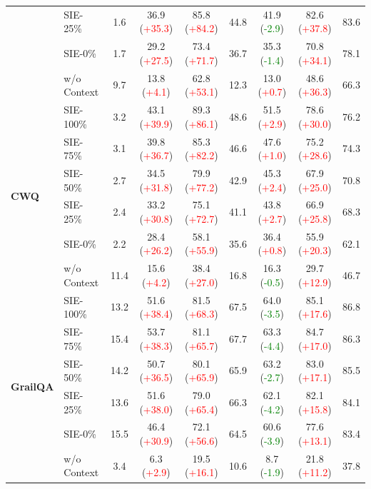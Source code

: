 \documentclass{article} %
\begin{document}
\begin{table}[t]
{\begin{tabular}{l|l|ccc|ccc|c}
& SIE-25\% & 1.6 & 36.9 (\textcolor{red}{+35.3}) & 85.8 (\textcolor{red}{+84.2}) & 44.8 & 41.9 (\textcolor{green}{-2.9}) & 82.6 (\textcolor{red}{+37.8}) & 83.6 \\
& SIE-0\% & 1.7 & 29.2 (\textcolor{red}{+27.5}) & 73.4 (\textcolor{red}{+71.7}) & 36.7 & 35.3 (\textcolor{green}{-1.4}) & 70.8 (\textcolor{red}{+34.1}) & 78.1 \\
& w/o Context & 9.7 & 13.8 (\textcolor{red}{+4.1}) & 62.8 (\textcolor{red}{+53.1}) & 12.3 & 13.0 (\textcolor{red}{+0.7}) & 48.6 (\textcolor{red}{+36.3}) & 66.3 \\
\hline
\multirow{6}{*}{\textbf{CWQ}} 
& SIE-100\% & 3.2 & 43.1 (\textcolor{red}{+39.9}) & 89.3 (\textcolor{red}{+86.1}) & 48.6 & 51.5 (\textcolor{red}{+2.9}) & 78.6 (\textcolor{red}{+30.0}) & 76.2 \\
& SIE-75\% & 3.1 & 39.8 (\textcolor{red}{+36.7}) & 85.3 (\textcolor{red}{+82.2}) & 46.6 & 47.6 (\textcolor{red}{+1.0}) & 75.2 (\textcolor{red}{+28.6}) & 74.3 \\
& SIE-50\% & 2.7 & 34.5 (\textcolor{red}{+31.8}) & 79.9 (\textcolor{red}{+77.2}) & 42.9 & 45.3 (\textcolor{red}{+2.4}) & 67.9 (\textcolor{red}{+25.0}) & 70.8 \\
& SIE-25\% & 2.4 & 33.2 (\textcolor{red}{+30.8}) & 75.1 (\textcolor{red}{+72.7}) & 41.1 & 43.8 (\textcolor{red}{+2.7}) & 66.9 (\textcolor{red}{+25.8}) & 68.3 \\
& SIE-0\% & 2.2 & 28.4 (\textcolor{red}{+26.2}) & 58.1 (\textcolor{red}{+55.9}) & 35.6 & 36.4 (\textcolor{red}{+0.8}) & 55.9 (\textcolor{red}{+20.3}) & 62.1 \\
& w/o Context & 11.4 & 15.6 (\textcolor{red}{+4.2}) & 38.4 (\textcolor{red}{+27.0}) & 16.8 & 16.3 (\textcolor{green}{-0.5}) & 29.7 (\textcolor{red}{+12.9}) & 46.7 \\
\hline
\multirow{6}{*}{\textbf{GrailQA}} 
& SIE-100\% & 13.2 & 51.6 (\textcolor{red}{+38.4}) & 81.5 (\textcolor{red}{+68.3}) & 67.5 & 64.0 (\textcolor{green}{-3.5}) & 85.1 (\textcolor{red}{+17.6}) & 86.8 \\
& SIE-75\% & 15.4 & 53.7 (\textcolor{red}{+38.3}) & 81.1 (\textcolor{red}{+65.7}) & 67.7 & 63.3 (\textcolor{green}{-4.4}) & 84.7 (\textcolor{red}{+17.0}) & 86.3 \\
& SIE-50\% & 14.2 & 50.7 (\textcolor{red}{+36.5}) & 80.1 (\textcolor{red}{+65.9}) & 65.9 & 63.2 (\textcolor{green}{-2.7}) & 83.0 (\textcolor{red}{+17.1}) & 85.5 \\
& SIE-25\% & 13.6 & 51.6 (\textcolor{red}{+38.0}) & 79.0 (\textcolor{red}{+65.4}) & 66.3 & 62.1 (\textcolor{green}{-4.2}) & 82.1 (\textcolor{red}{+15.8}) & 84.1 \\
& SIE-0\% & 15.5 & 46.4 (\textcolor{red}{+30.9}) & 72.1 (\textcolor{red}{+56.6}) & 64.5 & 60.6 (\textcolor{green}{-3.9}) & 77.6 (\textcolor{red}{+13.1}) & 83.4 \\
& w/o Context & 3.4 & 6.3 (\textcolor{red}{+2.9}) & 19.5 (\textcolor{red}{+16.1}) & 10.6 & 8.7 (\textcolor{green}{-1.9}) & 21.8 (\textcolor{red}{+11.2}) & 37.8 \\
\hline
\end{tabular}%
}
\label{tab:performance_comparison_final_corrected}
\end{table}
\end{document}
